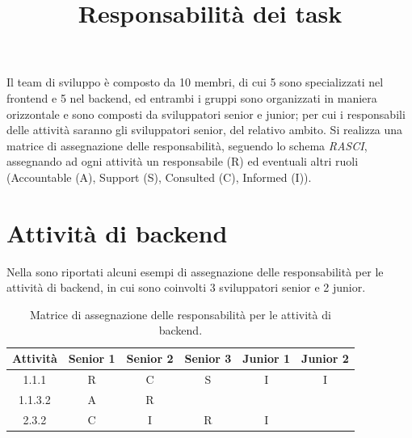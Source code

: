 \documentclass[a4paper,12pt]{article}
\title{\textbf{Responsabilità dei task}}
\author{}
\date{}
\begin{document}
\maketitle

Il team di sviluppo è composto da 10 membri, di cui 5 sono specializzati nel frontend e 5 nel backend, ed entrambi i
gruppi sono organizzati in maniera orizzontale e sono composti da sviluppatori senior e junior; per cui i responsabili
delle attività saranno gli sviluppatori senior, del relativo ambito.
Si realizza una matrice di assegnazione delle responsabilità, seguendo lo schema \textit{RASCI}, assegnando ad ogni
attività un responsabile (R) ed eventuali altri ruoli (Accountable (A), Support (S), Consulted (C), Informed (I)).

\section{Attività di backend}
Nella  sono riportati alcuni esempi di assegnazione delle responsabilità per le
attività di backend, in cui sono coinvolti 3 sviluppatori senior e 2 junior.
\begin{table}[!htb]
    \centering
    \begin{tabular}{|c|c|c|c|c|c|}
        \hline
        \textbf{Attività} & \textbf{Senior 1} & \textbf{Senior 2} & \textbf{Senior 3} & \textbf{Junior 1} & \textbf{Junior 2} \\ \hline
        1.1.1   & R & C & S & I & I \\ \hline
        1.1.3.2 & A & R &   &   &   \\ \hline
        2.3.2   & C & I & R & I &   \\ \hline
    \end{tabular}
    \caption{Matrice di assegnazione delle responsabilità per le attività di backend.}
    \label{tab:backend_task_responsabilities}
\end{table}
\end{document}
